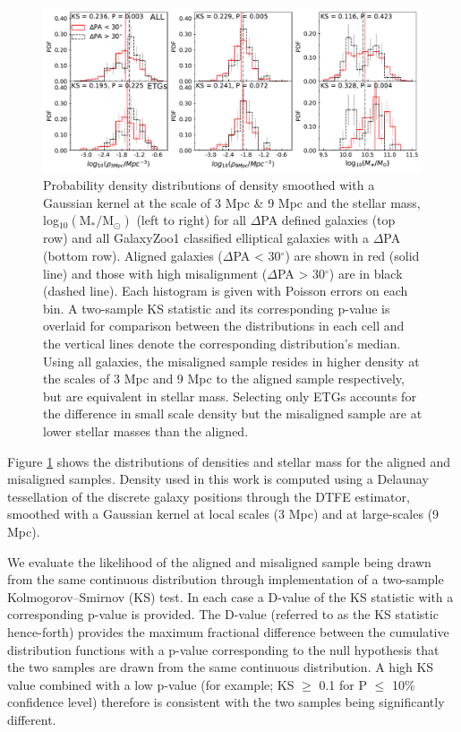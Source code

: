 \begin{figure}
    \centering
	\includegraphics[width=\linewidth]{thesis/latex/halo_assembly_manga/PA_ALL_ET_DENSITY.pdf}
    \caption[Probability density distributions of density smoothed with a Gaussian kernel at the scale of 3 Mpc \& 9 Mpc and the stellar mass, log$\mathrm{_{10}(M_{\ast}/M_{\odot})}$ for all $\Delta$PA defined galaxies and all GalaxyZoo1 classified elliptical galaxies with a $\Delta$PA.]{Probability density distributions of density smoothed with a Gaussian kernel at the scale of 3 Mpc \& 9 Mpc and the stellar mass, log$\mathrm{_{10}(M_{\ast}/M_{\odot})}$ (left to right) for all $\Delta$PA defined galaxies (top row) and all GalaxyZoo1 classified elliptical galaxies with a $\Delta$PA (bottom row). Aligned galaxies ($\Delta$PA < 30$^{\circ}$) are shown in red (solid line) and those with high misalignment ($\Delta$PA > 30$^{\circ}$) are in black (dashed line). Each histogram is given with Poisson errors on each bin. A two-sample KS statistic and its corresponding p-value is overlaid for comparison between the distributions in each cell and the vertical lines denote the corresponding distribution's median. Using all galaxies, the misaligned sample resides in higher density at the scales of 3 Mpc and 9 Mpc to the aligned sample respectively, but are equivalent in stellar mass. Selecting only ETGs accounts for the difference in small scale density but the misaligned sample are at lower stellar masses than the aligned.}
    \label{fig:density_hab}
\end{figure}

Figure \ref{fig:density_hab} shows the distributions of densities and stellar mass for the aligned and misaligned samples. Density used in this work is computed using a Delaunay tessellation of the discrete galaxy positions through the DTFE estimator, smoothed with a Gaussian kernel at local scales (3 Mpc) and at large-scales (9 Mpc). 

We evaluate the likelihood of the aligned and misaligned sample being drawn from the same continuous distribution through implementation of a two-sample Kolmogorov--Smirnov (KS) test. In each case a D-value of the KS statistic with a corresponding p-value is provided. The D-value (referred to as the KS statistic hence-forth) provides the maximum fractional difference between the cumulative distribution functions with a p-value corresponding to the null hypothesis that the two samples are drawn from the same continuous distribution. A high KS value combined with a low p-value (for example; KS $\geq$ 0.1 for P $\leq$ 10\% confidence level) therefore is consistent with the two samples being significantly different.

